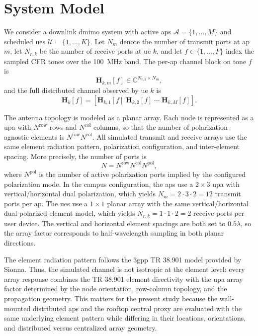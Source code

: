 \section{System Model}
\label{sec:system_model}

We consider a downlink \gls{dmimo} system with active \glspl{ap} $\mathcal{A}=\{1,\ldots,M\}$ and scheduled \glspl{ue} $\mathcal{U}=\{1,\ldots,K\}$. Let $N_m$ denote the number of transmit ports at \gls{ap} $m$, let $N_{r,k}$ be the number of receive ports at \gls{ue} $k$, and let $f \in \{1,\ldots,F\}$ index the sampled CFR tones over the \SI{100}{\mega\hertz} band. The per-\gls{ap} channel block on tone $f$ is
\begin{equation}
    \mathbf{H}_{k,m}[f] \in \mathbb{C}^{N_{r,k} \times N_m},
\end{equation}
and the full distributed channel observed by \gls{ue} $k$ is
\begin{equation}
    \mathbf{H}_k[f] = \left[\mathbf{H}_{k,1}[f]\;\mathbf{H}_{k,2}[f]\;\cdots\;\mathbf{H}_{k,M}[f]\right].
\end{equation}

The antenna topology is modeled as a planar array. Each node is represented as a \gls{upa} with $N^{\mathrm{row}}$ rows and $N^{\mathrm{col}}$ columns, so that the number of polarization-agnostic elements is $N^{\mathrm{row}}N^{\mathrm{col}}$. All simulated transmit and receive arrays use the same element radiation pattern, polarization configuration, and inter-element spacing. More precisely, the number of ports is
\begin{equation}
    N = N^{\mathrm{row}} N^{\mathrm{col}} N^{\mathrm{pol}},
\end{equation}
where $N^{\mathrm{pol}}$ is the number of active polarization ports implied by the configured polarization mode. In the campus configuration, the \glspl{ap} use a $\num{2} \times \num{3}$ \gls{upa} with vertical/horizontal dual polarization, which yields $N_m=\num{2} \cdot \num{3} \cdot \num{2}=\num{12}$ transmit ports per \gls{ap}. The \glspl{ue} use a $\num{1} \times \num{1}$ planar array with the same vertical/horizontal dual-polarized element model, which yields $N_{r,k}=\num{1} \cdot \num{1} \cdot \num{2}=\num{2}$ receive ports per user device. The vertical and horizontal element spacings are both set to $\num{0.5}\lambda$, so the array factor corresponds to half-wavelength sampling in both planar directions.

The element radiation pattern follows the \gls{3gpp} TR 38.901 model provided by Sionna. Thus, the simulated channel is not isotropic at the element level: every array response combines the TR 38.901 element directivity with the \gls{upa} array factor determined by the node orientation, row-column topology, and the propagation geometry. This matters for the present study because the wall-mounted distributed \glspl{ap} and the rooftop central proxy are evaluated with the same underlying element pattern while differing in their locations, orientations, and distributed versus centralized array geometry.

